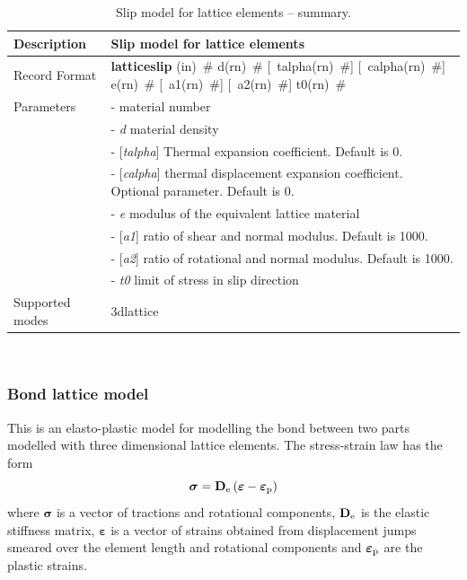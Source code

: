 \documentclass[a4paper]{article}
\newcommand{\descitem}[1]{{\noindent \bf #1}}
\newcommand{\elemparam}[2]{{{#1\tiny (#2)}~\#}}
\newcommand{\optelemparam}[2]{[{~\elemparam{#1}{#2}}]}
\newcommand{\param}[1]{{\it #1}}
\newcommand{\optparam}[1]{[{\it #1}]}
\newenvironment{mmt}{\begin{tabular}{|l|p{9cm}|}}{\end{tabular}\\}
\newenvironment{mmt}{\begin{tabular}{|l|l|}}{\end{tabular}\\}
\begin{document}
\begin{table}[!htb]
\begin{mmt}
\hline
Description & Slip model for lattice elements \\
\hline
Record Format & \descitem{latticeslip} \elemparam{}{in} 
\elemparam{d}{rn} \optelemparam{talpha}{rn} \optelemparam{calpha}{rn} \elemparam{e}{rn} \optelemparam{a1}{rn} \optelemparam{a2}{rn} \elemparam{t0}{rn}\\
Parameters &- \param{} material number\\
&- \param{d} material density\\
&- \optparam{talpha} Thermal expansion coefficient. Default is 0.\\
&- \optparam{calpha} thermal displacement expansion coefficient. Optional parameter. Default is 0.\\
&- \param{e} modulus of the equivalent lattice material\\
&- \optparam{a1} ratio of shear and normal modulus. Default is 1000.\\
&- \optparam{a2} ratio of rotational and normal modulus. Default is 1000.\\
&- \param{t0} limit of stress in slip direction\\

Supported modes & 3dlattice\\
\hline
\end{mmt}
\caption{Slip model for lattice elements -- summary.}
\label{latticeslip_table}
\end{table}


\subsubsection{Bond lattice model}
This is an elasto-plastic model for modelling the bond between two parts modelled with three dimensional lattice elements.
The stress-strain law has the form
\begin{equation}
\boldsymbol{\sigma} = \mathbf{D}_{\rm e} \left(\boldsymbol{\varepsilon}-\boldsymbol{\varepsilon}_{\rm p} \right)
\end{equation}
where $\boldsymbol{\sigma}$ is a vector of tractions and rotational components, $\mathbf{D}_{\rm e}$ is the elastic stiffness matrix, $\boldsymbol{\varepsilon}$ is a vector of strains obtained from displacement jumps smeared over the element length and rotational components and $\boldsymbol{\varepsilon}_{\rm p}$ are the plastic strains.
\end{document}

